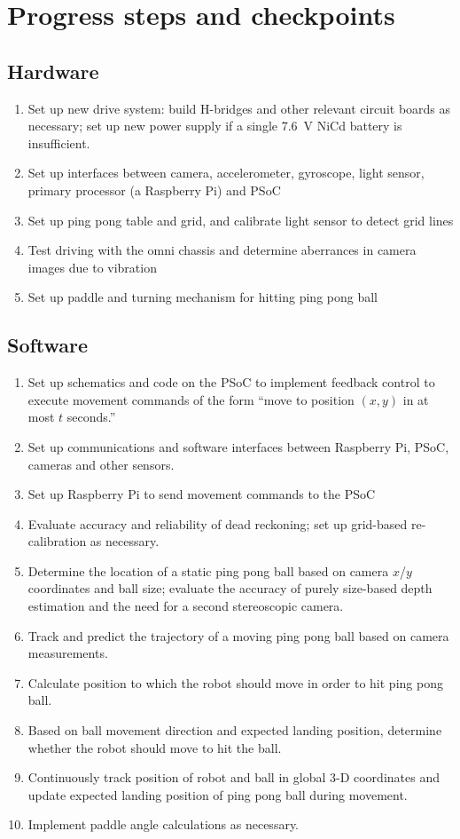 \documentclass[letterpaper, 11pt]{article}
\begin{document}
\section{Progress steps and checkpoints}
\subsection*{Hardware}
\begin{enumerate}
    \item Set up new drive system: build H-bridges and other relevant circuit boards as necessary; set up new power supply if a single 7.6~V NiCd battery is insufficient.
    \item Set up interfaces between camera, accelerometer, gyroscope, light sensor, primary processor (a Raspberry Pi) and PSoC
    \item Set up ping pong table and grid, and calibrate light sensor to detect grid lines
    \item Test driving with the omni chassis and determine aberrances in camera images due to vibration
    \item Set up paddle and turning mechanism for hitting ping pong ball
\end{enumerate}

\subsection*{Software}
\begin{enumerate}
    \item Set up schematics and code on the PSoC to implement feedback control to execute movement commands of the form ``move to position $(x, y)$ in at most $t$ seconds.''
    \item Set up communications and software interfaces between Raspberry Pi, PSoC, cameras and other sensors.
    \item Set up Raspberry Pi to send movement commands to the PSoC
    \item Evaluate accuracy and reliability of dead reckoning; set up grid-based re-calibration as necessary.
    \item Determine the location of a static ping pong ball based on camera $x$/$y$ coordinates and ball size; evaluate the accuracy of purely size-based depth estimation and the need for a second stereoscopic camera.
    \item Track and predict the trajectory of a moving ping pong ball based on camera measurements.
    \item Calculate position to which the robot should move in order to hit ping pong ball.
    \item Based on ball movement direction and expected landing position, determine whether the robot should move to hit the ball.
    \item Continuously track position of robot and ball in global 3-D coordinates and update expected landing position of ping pong ball during movement.
    \item Implement paddle angle calculations as necessary.
\end{enumerate}
\end{document}
